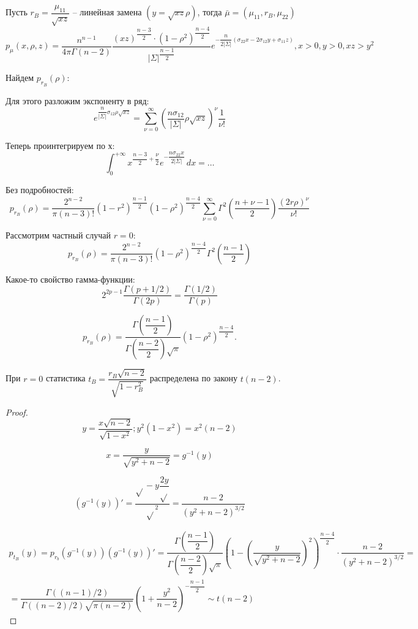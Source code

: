 \begin{theorem}[Следствие]
  Пусть $r_B = \dfrac{\mu_{11}}{\sqrt{xz}}$ -- линейная замена $(y = \sqrt{xz} \rho)$, тогда $\bar \mu = (\mu_{11}, r_B, \mu_{22})$
  \[
    p_\mu (x, \rho, z) = 
    \dfrac{n^{n-1}}{4\pi \Gamma(n-2)}
    \dfrac{(xz)^\dfrac{n-3}{2} \cdot (1-\rho^2)^\dfrac{n-4}{2}}{|\Sigma|^\dfrac{n-1}{2}}
    e^{-\dfrac{n}{2 |\Sigma|} (\sigma_{22} x - 2 \sigma_{12}y + \sigma_{11} z) }, x>0, y>0, xz>y^2
  \]

  Найдем $p_{r_B} (\rho)$:

  Для этого разложим экспоненту в ряд:
  \[
    e^{ \dfrac{n}{|\Sigma|} \sigma_{12} \rho \sqrt{xz} }
    = \sum_{\nu=0}^\infty \left(\dfrac{n \sigma_{12}}{|\Sigma|} \rho \sqrt{xz} \right)^\nu \dfrac{1}{\nu!}
  \]

  Теперь проинтегрируем по х:
  \[
    \int_0^{+\infty} x^{\dfrac{n-3}{2} + \dfrac{\nu}{2}} e^{-\dfrac{n \sigma_{22} x}{2 |\Sigma|}} \, dx = \dots %
  \]

  Без подробностей:
  \[
    p_{r_B} (\rho) = \dfrac{2^{n-2}}{\pi (n-3)!}
    (1 - r^2)^{\dfrac{n-1}{2}}
    (1-\rho^2)^{\dfrac{n-4}{2}}
    \sum_{\nu=0}^\infty \Gamma^2\left(\dfrac{n+\nu-1}{2}\right) \dfrac{(2 r \rho)^\nu}{\nu!}
  \]
\end{theorem}

Рассмотрим частный случай $r=0$:
\[
  p_{r_B} (\rho) = \dfrac{2^{n-2}}{\pi (n-3)!}
  (1-\rho^2)^{\dfrac{n-4}{2}}
  \Gamma^2\left(\dfrac{n-1}{2}\right)
\]

Какое-то свойство гамма-функции:
\[
  2^{2p-1} \dfrac{\Gamma(p+1/2)}{\Gamma(2p)} = \dfrac{\Gamma(1/2)}{\Gamma(p)}
\]

\[
  p_{r_B} (\rho) = \dfrac{\Gamma(\dfrac{n-1}{2})}{\Gamma(\dfrac{n-2}{2}) \sqrt{\pi}} (1-\rho^2)^{\dfrac{n-4}{2}}.
\]


\begin{theorem}
  При $r=0$ статистика $t_B = \dfrac{r_B \sqrt{n-2}}{\sqrt{1 - r_B^2}}$
  распределена по закону $t(n-2)$.
\end{theorem}

\begin{proof}
  \[
    y = \dfrac{x \sqrt{n-2}}{\sqrt{1-x^2}}; y^2 (1-x^2) = x^2 (n-2)
  \]

  \[
    x = \dfrac{y}{\sqrt{y^2+n-2}} = g^{-1} (y)
  \]

  \[
    (g^{-1} (y))' = \dfrac{\sqrt{} - y \dfrac{2y}{\sqrt{} } }{\sqrt{}^2} = \dfrac{n-2}{(y^2 + n - 2)^{3/2}}
  \]

  \begin{multline*}
    p_{t_B} (y) = p_{r_b} (g^{-1}(y)) (g^{-1}(y))'
    = \dfrac{\Gamma(\dfrac{n-1}{2})}{\Gamma(\dfrac{n-2}{2}) \sqrt{\pi}}
    (1-(\dfrac{y}{\sqrt{y^2+n-2}})^2)^{\dfrac{n-4}{2}} \cdot
    \dfrac{n-2}{(y^2 + n - 2)^{3/2}} = \\
    = \dfrac{\Gamma((n-1)/2)}{\Gamma((n-2)/2) \sqrt{\pi (n-2)}} (1 + \dfrac{y^2}{n-2})^{-\dfrac{n-1}{2}} \sim t(n-2)
  \end{multline*}
\end{proof}


